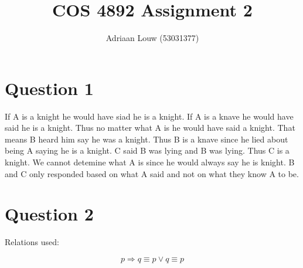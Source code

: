 \documentclass[10pt,a4paper]{article}
\title{COS 4892 Assignment 2}
\author{Adriaan Louw (53031377)}
\begin{document}
\maketitle

\section{Question 1}

If A is a knight he would have siad he is a knight. If A is a knave he would have said he is a knight. Thus no matter what A is he would have said a knight. That means B heard him say he was a knight. Thus B is a knave since he lied about being A saying he is a knight. C said B was lying and B was lying. Thus C is a knight. We cannot detemine what A is since he would always say he is knight. B and C only responded based on what A said and not on what they know A to be.

\section{Question 2}
Relations used:

\begin{equation}
 p \Rightarrow q \equiv p \vee q \equiv p
 \label{onlyif}
\end{equation}
\end{document}
